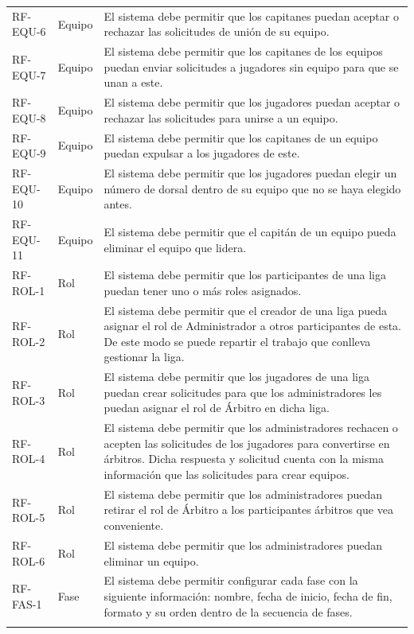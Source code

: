 {\begin{xltabular}{\textwidth}{>{\RaggedRight}p{1.7cm} p{1.8cm} >{\RaggedRight\arraybackslash}X}
        RF-EQU-6 & Equipo & El sistema debe permitir que los capitanes puedan aceptar o rechazar las solicitudes de unión de su equipo. \\ \lightrule
        RF-EQU-7 & Equipo & El sistema debe permitir que los capitanes de los equipos puedan enviar solicitudes a jugadores sin equipo para que se unan a este. \\ \lightrule
        RF-EQU-8 & Equipo & El sistema debe permitir que los jugadores puedan aceptar o rechazar las solicitudes para unirse a un equipo. \\ \lightrule
        RF-EQU-9 & Equipo & El sistema debe permitir que los capitanes de un equipo puedan expulsar a los jugadores de este. \\ \lightrule
        RF-EQU-10 & Equipo & El sistema debe permitir que los jugadores puedan elegir un número de dorsal dentro de su equipo que no se haya elegido antes. \\ \lightrule
        RF-EQU-11 & Equipo & El sistema debe permitir que el capitán de un equipo pueda eliminar el equipo que lidera. \\ \lightrule
        RF-ROL-1 & Rol & El sistema debe permitir que los participantes de una liga puedan tener uno o más roles asignados. \\ \lightrule
        RF-ROL-2 & Rol & El sistema debe permitir que el creador de una liga pueda asignar el rol de Administrador a otros participantes de esta. De este modo se puede repartir el trabajo que conlleva gestionar la liga. \\ \lightrule
        RF-ROL-3 & Rol & El sistema debe permitir que los jugadores de una liga puedan crear solicitudes para que los administradores les puedan asignar el rol de Árbitro en dicha liga. \\ \lightrule
        RF-ROL-4 & Rol & El sistema debe permitir que los administradores rechacen o acepten las solicitudes de los jugadores para convertirse en árbitros. Dicha respuesta y solicitud cuenta con la misma información que las solicitudes para crear equipos. \\ \lightrule
        RF-ROL-5 & Rol & El sistema debe permitir que los administradores puedan retirar el rol de Árbitro a los participantes árbitros que vea conveniente. \\ \lightrule
        RF-ROL-6 & Rol & El sistema debe permitir que los administradores puedan eliminar un equipo. \\ \lightrule
        RF-FAS-1 & Fase & El sistema debe permitir configurar cada fase con la siguiente información: nombre, fecha de inicio, fecha de fin, formato y su orden dentro de la secuencia de fases. \\ \lightrule

\end{xltabular}}
